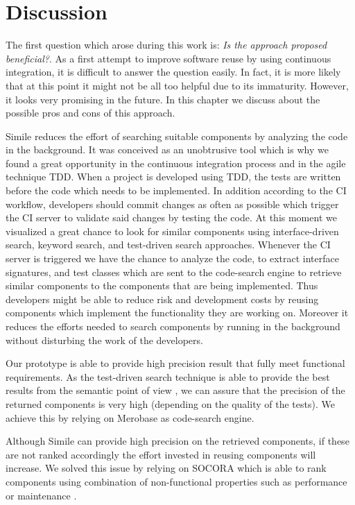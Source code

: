 \chapter{Discussion}
\label{discussion}
The first question which arose during this work is: \emph{Is the approach proposed beneficial?}. As a first attempt to improve software reuse by using continuous integration, it is difficult to answer the question easily. In fact, it is more likely that at this point it might not be all too helpful due to its immaturity. However, it looks very promising in the future. In this chapter we discuss about the possible pros and cons of this approach.

Simile reduces the effort of searching suitable components by analyzing the code in the background. It was conceived as an unobtrusive tool which is why we found a great opportunity in the continuous integration process and in the agile technique TDD. When a project is developed using TDD, the tests are written before the code which needs to be implemented. In addition according to the CI workflow, developers should commit changes as often as possible which trigger the CI server to validate said changes by testing the code. At this moment we visualized a great chance to look for similar components using interface-driven search, keyword search, and test-driven search approaches. Whenever the CI server is triggered we have the chance to analyze the code, to extract interface signatures, and test classes which are sent to the code-search engine to retrieve similar components to the components that are being implemented. Thus developers might be able to reduce risk and development costs by reusing components which implement the functionality they are working on. Moreover it reduces the efforts needed to search components by running in the background without disturbing the work of the developers.

Our prototype is able to provide high precision result that fully meet functional requirements. As the test-driven search technique is able to provide the best results from the semantic point of view \cite{Reiss2009,Hummel2008,Hummel2013}, we can assure that the precision of the returned components is very high (depending on the quality of the tests). We achieve this by relying on Merobase as code-search engine.

Although Simile can provide high precision on the retrieved components, if these are not ranked accordingly the effort invested in reusing components will increase. We solved this issue by relying on SOCORA which is able to rank components using combination of non-functional properties such as performance or maintenance \cite{Kessel2016}.

